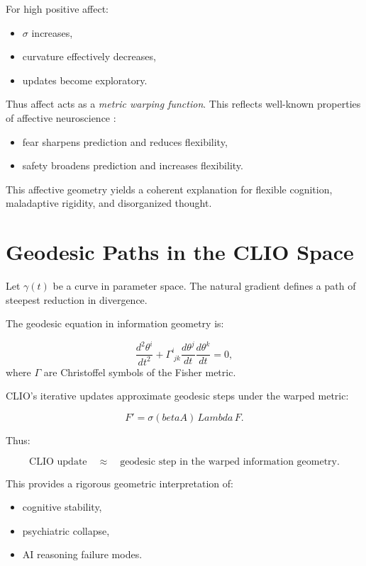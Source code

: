 \documentclass[12pt,oneside]{book}
\theoremstyle{plain}
\theoremstyle{definition}
\let\citep\parencite
\def\beta{beta}%
\def\Lambda{Lambda}%
\begin{document}
For high positive affect:

\begin{itemize}
    \item $\sigma$ increases,
    \item curvature effectively decreases,
    \item updates become exploratory.
\end{itemize}

Thus affect acts as a \emph{metric warping function}.
This reflects well-known properties of affective neuroscience
\citep{solms2021hidden,panksepp1998affective}:

\begin{itemize}
    \item fear sharpens prediction and reduces flexibility,
    \item safety broadens prediction and increases flexibility.
\end{itemize}

This affective geometry yields a coherent explanation for flexible cognition,
maladaptive rigidity, and disorganized thought.

\section{Geodesic Paths in the CLIO Space}

Let $\gamma(t)$ be a curve in parameter space.
The natural gradient defines a path of steepest reduction in divergence.

The geodesic equation in information geometry is:

\[
\frac{d^2 \theta^i}{dt^2}
+ \Gamma^i_{\; jk}
\frac{d \theta^j}{dt}
\frac{d \theta^k}{dt}
= 0,
\]
where $\Gamma$ are Christoffel symbols of the Fisher metric.

CLIO's iterative updates approximate geodesic steps under the warped metric:

\[
F' = \sigma(\beta A)\, \Lambda\, F.
\]

Thus:

\[
\text{CLIO update}
\quad \approx \quad
\text{geodesic step in the warped information geometry}.
\]

This provides a rigorous geometric interpretation of:

\begin{itemize}
    \item cognitive stability,
    \item psychiatric collapse,
    \item AI reasoning failure modes.
\end{itemize}
\end{document}
